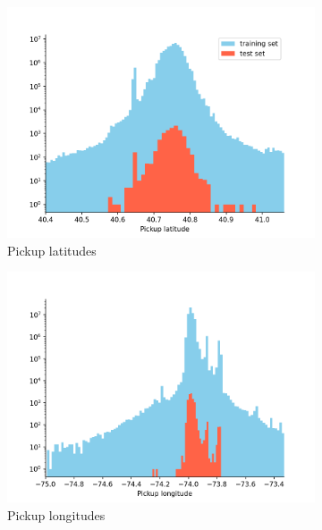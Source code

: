\documentclass[12pt,letterpaper,final]{article}
\numberwithin{equation}{section}
\begin{document}
\begin{figure}[H]
\centering
\begin{subfigure}{0.51\textwidth}
  \centering
  \includegraphics[width=.85\linewidth,keepaspectratio]{plots/dropped_outliers/pickup_latitude_training.png}
\caption{Pickup latitudes}
\end{subfigure}%
\hspace*{-2cm}
\begin{subfigure}{.51\textwidth}
  \centering
  \includegraphics[width=.85\linewidth,keepaspectratio]{plots/dropped_outliers/pickup_longitude_training.png}
  \caption{Pickup longitudes}
\end{subfigure}
\linebreak
\begin{subfigure}{0.51\textwidth}
  \centering

\end{subfigure}
\end{figure}
\end{document}
